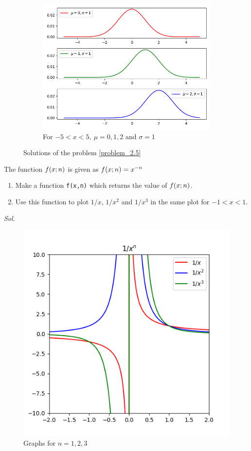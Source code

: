 \begin{figure}[h!]
\begin{subfigure}[b]{0.5\linewidth}
            \includegraphics[width=\linewidth]{img/chapter2/2-5/2_5_plot_c.png}
            \caption{For $-5<x<5, \ \mu=0,1,2$ and $\sigma=1$}
        \end{subfigure}
        \caption{Solutions of the problem \ref{problem_2.5}}
        \label{fig:problem 2-5}
    \end{figure}


    \begin{problem}[Plotting $1/x^{n}$]\label{problem_2.6}
        The function $f\qty(x;n)$ is given as $f\qty(x;n)=x^{-n}$
        \begin{enumerate}
            \item Make a function \verb|f(x,n)| which returns the value of $f\qty(x;n)$.
            \item Use this function to plot $1/x$, $1/x^{2}$ and $1/x^{3}$ in the same plot for $-1<x<1$.
        \end{enumerate}
    \end{problem}
    \textit{ Sol. }
    
    \begin{figure}[h!]
        \centering
        \includegraphics[width=0.5\linewidth]{img/chapter2/2-6/2_6_plot_xs.png}
        \caption{Graphs for $n=1,2,3$}
        \label{fig:problem 2-6} 
    \end{figure}


